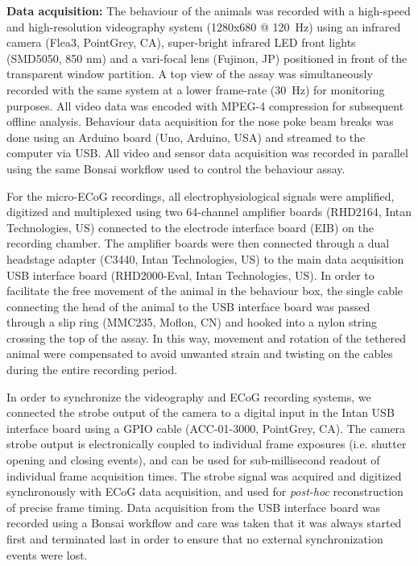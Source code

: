 \textbf{Data acquisition:} The behaviour of the animals was recorded with a high-speed and high-resolution videography system (1280x680 @ \SI{120}{\hertz}) using an infrared camera (Flea3, PointGrey, CA), super-bright infrared LED front lights (SMD5050, 850 nm) and a vari-focal lens (Fujinon, JP) positioned in front of the transparent window partition. A top view of the assay was simultaneously recorded with the same system at a lower frame-rate (\SI{30}{\hertz}) for monitoring purposes. All video data was encoded with MPEG-4 compression for subsequent offline analysis. Behaviour data acquisition for the nose poke beam breaks was done using an Arduino board (Uno, Arduino, USA) and streamed to the computer via USB. All video and sensor data acquisition was recorded in parallel using the same Bonsai workflow used to control the behaviour assay.

For the micro-ECoG recordings, all electrophysiological signals were amplified, digitized and multiplexed using two 64-channel amplifier boards (RHD2164, Intan Technologies, US) connected to the electrode interface board (EIB) on the recording chamber. The amplifier boards were then connected through a dual headstage adapter (C3440, Intan Technologies, US) to the main data acquisition USB interface board (RHD2000-Eval, Intan Technologies, US). In order to facilitate the free movement of the animal in the behaviour box, the single cable connecting the head of the animal to the USB interface board was passed through a slip ring (MMC235, Moflon, CN) and hooked into a nylon string crossing the top of the assay. In this way, movement and rotation of the tethered animal were compensated to avoid unwanted strain and twisting on the cables during the entire recording period.

In order to synchronize the videography and ECoG recording systems, we connected the strobe output of the camera to a digital input in the Intan USB interface board using a GPIO cable (ACC-01-3000, PointGrey, CA). The camera strobe output is electronically coupled to individual frame exposures (i.e. shutter opening and closing events), and can be used for sub-millisecond readout of individual frame acquisition times. The strobe signal was acquired and digitized synchronously with ECoG data acquisition, and used for \emph{post-hoc} reconstruction of precise frame timing. Data acquisition from the USB interface board was recorded using a Bonsai workflow and care was taken that it was always started first and terminated last in order to ensure that no external synchronization events were lost.

